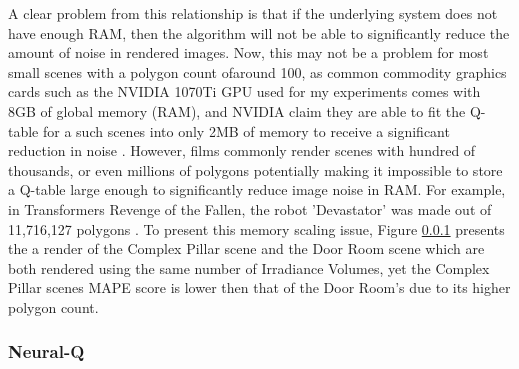 \documentclass[../dissertation.tex]{subfiles}
\begin{document}
A clear problem from this relationship is that if the underlying system does not have enough RAM, then the algorithm will not be able to significantly reduce the amount of noise in rendered images. Now, this may not be a problem for most small scenes with a polygon count ofaround 100, as common commodity graphics cards such as the NVIDIA 1070Ti GPU used for my experiments comes with 8GB of global memory (RAM), and NVIDIA claim they are able to fit the Q-table for a such scenes into only 2MB of memory to receive a significant reduction in noise \cite{dahm2017learning}. However, films commonly render scenes with hundred of thousands, or even millions of polygons potentially making it impossible to store a Q-table large enough to significantly reduce image noise in RAM. For example, in Transformers Revenge of the Fallen, the robot 'Devastator' was made out of 11,716,127 polygons \cite{devastator}. To present this memory scaling issue, Figure \ref{} presents the a render of the Complex Pillar scene and the Door Room scene which are both rendered using the same number of Irradiance Volumes, yet the Complex Pillar scenes MAPE score is lower then that of the Door Room's due to its higher polygon count.\\


\subsubsection{Neural-Q}
\end{document}
